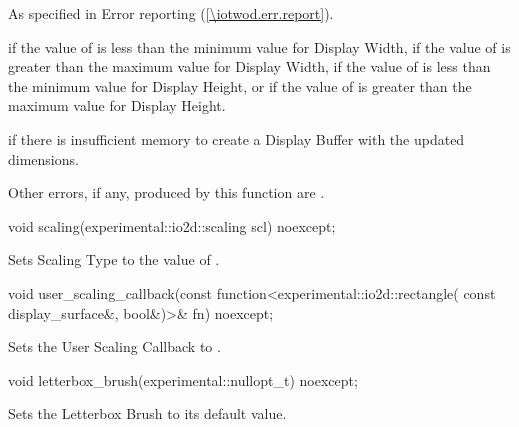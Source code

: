 \begin{itemdescr}
\pnum
\throws
As specified in Error reporting (\ref{\iotwod.err.report}).

\pnum
\errors
{} if the value of  is less than the minimum value for Display Width, if the value of  is greater than the maximum value for Display Width, if the value of  is less than the minimum value for Display Height, or if the value of  is greater than the maximum value for Display Height.

 if there is insufficient memory to create a Display Buffer with the updated dimensions.

Other errors, if any, produced by this function are .
\end{itemdescr}

\begin{itemdecl}
void scaling(experimental::io2d::scaling scl) noexcept;
\end{itemdecl}
\begin{itemdescr}
\pnum
\effects
Sets Scaling Type to the value of .
\end{itemdescr}

\begin{itemdecl}
void user_scaling_callback(const function<experimental::io2d::rectangle(
  const display_surface&, bool&)>& fn) noexcept;
\end{itemdecl}
\begin{itemdescr}
\pnum
\effects
Sets the User Scaling Callback to .
\end{itemdescr}

\begin{itemdecl}
void letterbox_brush(experimental::nullopt_t) noexcept;
\end{itemdecl}
\begin{itemdescr}
\pnum
\effects
Sets the Letterbox Brush to its default value.
\end{itemdescr}

